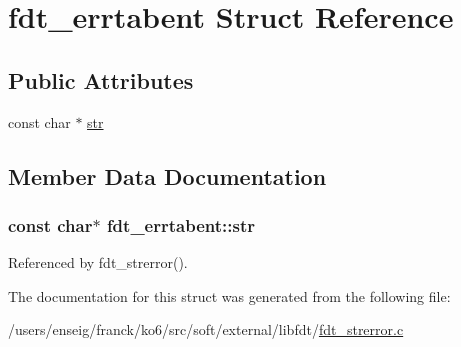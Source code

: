 \hypertarget{structfdt__errtabent}{\section{fdt\-\_\-errtabent Struct Reference}
\label{structfdt__errtabent}
}
\subsection*{Public Attributes}
\begin{DoxyCompactItemize}
\item 
const char $\ast$ \hyperlink{structfdt__errtabent_afb5741d1d343729e8d9025a7cc129315}{str}
\end{DoxyCompactItemize}


\subsection{Member Data Documentation}
\hypertarget{structfdt__errtabent_afb5741d1d343729e8d9025a7cc129315}{
\subsubsection[{str}]{\setlength{\rightskip}{0pt plus 5cm}const char$\ast$ fdt\-\_\-errtabent\-::str}}\label{structfdt__errtabent_afb5741d1d343729e8d9025a7cc129315}


Referenced by fdt\-\_\-strerror().



The documentation for this struct was generated from the following file\-:\begin{DoxyCompactItemize}
\item 
/users/enseig/franck/ko6/src/soft/external/libfdt/\hyperlink{fdt__strerror_8c}{fdt\-\_\-strerror.\-c}\end{DoxyCompactItemize}
